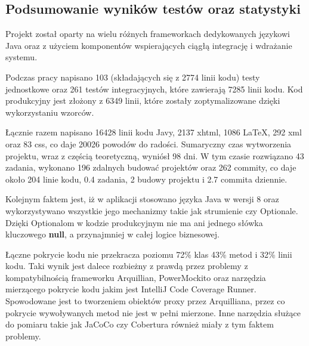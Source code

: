 \subsection{Podsumowanie wyników testów oraz statystyki}
Projekt został oparty na wielu różnych frameworkach dedykowanych językowi Java oraz z użyciem komponentów wspierających ciągłą integrację i wdrażanie systemu.

Podczas pracy napisano 103 (składających się z 2774 linii kodu) testy jednostkowe oraz 261 testów integracyjnych, które zawierają 7285 linii kodu. Kod produkcyjny jest złożony z 6349 linii, które zostały zoptymalizowane dzięki wykorzystaniu wzorców. 

Łącznie razem napisano 16428 linii kodu Javy, 2137 xhtml, 1086 \LaTeX, 292 xml oraz 83 css, co daje 20026 powodów do radości.  Sumaryczny czas wytworzenia projektu, wraz z częścią teoretyczną, wyniósł 98 dni. W tym czasie rozwiązano 43 zadania, wykonano 196 zdalnych budować projektów oraz 262 commity, co daje około 204 linie kodu, 0.4 zadania, 2 budowy projektu i 2.7 commita dziennie.

Kolejnym faktem jest, iż w aplikacji stosowano języka Java w wersji 8 oraz wykorzystywano wszystkie jego mechanizmy takie jak strumienie czy Optionale. Dzięki Optionalom w kodzie produkcyjnym nie ma ani jednego słówka kluczowego \textbf{null}, a przynajmniej w całej logice biznesowej.

Łączne pokrycie kodu nie przekracza poziomu 72\% klas 43\% metod i 32\% linii kodu. Taki wynik jest dalece rozbieżny z prawdą przez problemy z kompatybilnością frameworku Arquillian, PowerMockito oraz narzędzia mierzącego pokrycie kodu jakim jest IntelliJ Code Coverage Runner. Spowodowane jest to tworzeniem obiektów proxy przez Arquilliana, przez co pokrycie wywoływanych metod nie jest w pełni mierzone. Inne narzędzia służące do pomiaru takie jak JaCoCo czy Cobertura również miały z tym faktem problemy.
